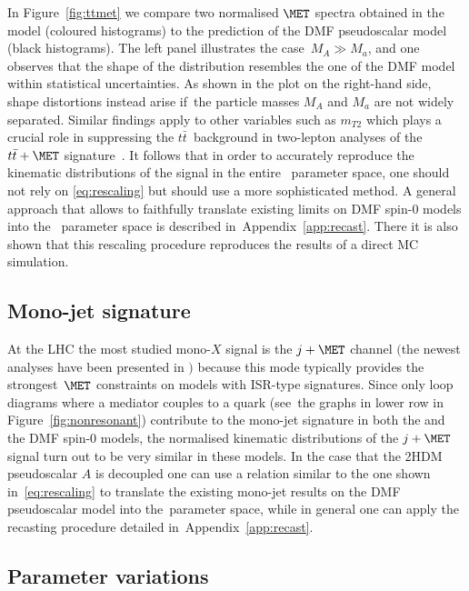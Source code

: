 {\color{red} In Figure~\ref{fig:ttmet} we compare two normalised $\MET$ spectra obtained in the \hdma model (coloured histograms) to the prediction of the DMF pseudoscalar   model (black histograms).  The left panel illustrates the case~$M_A \gg M_a$, and one observes that the shape of the \hdma distribution resembles  the one of the DMF model within statistical uncertainties. As shown in the plot on the right-hand side, shape distortions instead arise if~the particle masses $M_A$ and $M_a$ are not widely separated.  Similar findings apply to other variables such as $m_{T2}$ which  plays a crucial role in suppressing the $t \bar t$~background in two-lepton analyses of the $t \bar t + \MET$ signature~\cite{Aaboud:2017rzf,Haisch:2016gry}. It follows that in order to accurately reproduce the kinematic distributions of the signal in the entire \hdma~parameter space, one should not rely on \eqref{eq:rescaling} but should use a more sophisticated method. A general approach  that allows to faithfully translate existing limits on DMF spin-0   models into the \hdma~parameter space  is described in~Appendix~\ref{app:recast}. There it is also shown that this rescaling procedure reproduces the results of a direct MC simulation. 
}

\subsection*{Mono-jet signature}

At the LHC the most studied mono-$X$ signal is the $j +\MET$ channel $\big($the newest analyses have been presented in \cite{Aaboud:2017phn,Sirunyan:2017jix}$\big)$ because this mode typically provides the strongest~$\MET$ constraints on models with ISR-type  signatures. Since only loop diagrams where a mediator couples to a quark (see~the graphs in lower row in Figure~\ref{fig:nonresonant}) contribute to the mono-jet signature in both the \hdma and the DMF spin-0 models, the normalised kinematic distributions of the $j +\MET$ signal turn out to be very similar in these models. In the case that the 2HDM pseudoscalar $A$ is decoupled one can use a relation similar to the one shown in~\eqref{eq:rescaling} to translate the existing mono-jet results on the DMF pseudoscalar model into the~\hdma parameter space, while in general one can apply the recasting procedure detailed in~Appendix~\ref{app:recast}.

\subsection{Parameter variations}

